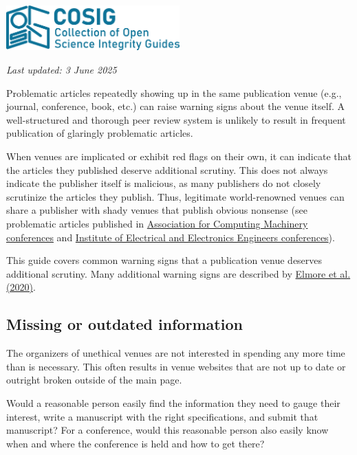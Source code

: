 \documentclass[letterpaper, 12pt]{article}
\begin{document}
\flushleft\includegraphics[width=0.5\textwidth]{img/home/241017_final_logo_mockup.png}

\textit{Last updated: 3 June 2025}

Problematic articles repeatedly showing up in the same publication venue (e.g., journal, conference, book, etc.) can raise warning signs about the venue itself. A well-structured and thorough peer review system is unlikely to result in frequent publication of glaringly problematic articles.

When venues are implicated or exhibit red flags on their own, it can indicate that the articles they published deserve additional scrutiny.
This does not always indicate the publisher itself is malicious, as many publishers do not closely scrutinize the articles they publish.
Thus, legitimate world-renowned venues can share a publisher with shady venues that publish obvious nonsense (see problematic articles published in \href{https://solalpirelli.github.io/2023/01/25/troubling-acm-venues.html}{Association for Computing Machinery conferences} and \href{https://deevybee.blogspot.com/2025/02/ieee-has-pseudoscience-problem.html}{Institute of Electrical and Electronics Engineers conferences}).

This guide covers common warning signs that a publication venue deserves additional scrutiny. Many additional warning signs are described by \href{https://doi.org/10.1177/0192623320920209}{Elmore et al. (2020)}.

\subsection*{Missing or outdated information}

The organizers of unethical venues are not interested in spending any more time than is necessary.
This often results in venue websites that are not up to date or outright broken outside of the main page.

Would a reasonable person easily find the information they need to gauge their interest,
write a manuscript with the right specifications, and submit that manuscript?
For a conference, would this reasonable person also easily know when and where the conference is held and how to get there?
\end{document}
